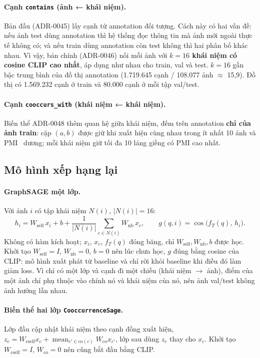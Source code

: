 \documentclass[12pt, a4paper]{article}
\newcommand{\code}[1]{\texttt{#1}}
\begin{document}
\paragraph{Cạnh \code{contains} (ảnh ← khái niệm).} Bản đầu (ADR-0045) lấy cạnh từ annotation đối tượng. Cách này có hai vấn đề: nếu ảnh test dùng annotation thì hệ thống đọc thông tin mà ảnh mới ngoài thực tế không có; và nếu train dùng annotation còn test không thì hai phân bố khác nhau. Vì vậy, bản chính (ADR-0046) nối mỗi ảnh với \textbf{$k=16$ khái niệm có cosine CLIP cao nhất}, áp dụng như nhau cho train, val và test. $k=16$ gần bậc trung bình của đồ thị annotation (1.719.645 cạnh / 108.077 ảnh $\approx$ 15,9). Đồ thị có 1.569.232 cạnh ở train và 80.000 cạnh ở mỗi tập val/test.

\paragraph{Cạnh \code{cooccurs\_with} (khái niệm ← khái niệm).} Biến thể ADR-0048 thêm quan hệ giữa khái niệm, đếm trên annotation \textbf{chỉ của ảnh train}: cặp $(a,b)$ được giữ khi xuất hiện cùng nhau trong ít nhất 10 ảnh và PMI~\cite{church1990pmi} dương; mỗi khái niệm giữ tối đa 10 láng giềng có PMI cao nhất.

\subsection{Mô hình xếp hạng lại}
\label{sec:model}
\paragraph{GraphSAGE một lớp.} Với ảnh $i$ có tập khái niệm $N(i)$, $|N(i)|=16$:
\begin{equation}
h_i = W_{\text{self}}\,x_i + b + \frac{1}{|N(i)|}\sum_{c\in N(i)} W_{\text{nb}}\,x_c,
\qquad g(q,i)=\cos\big(f_T(q),\,h_i\big).
\end{equation}
Không có hàm kích hoạt; $x_i$, $x_c$, $f_T(q)$ đóng băng, chỉ $W_{\text{self}}, W_{\text{nb}}, b$ được học. Khởi tạo $W_{\text{self}}=I$, $W_{\text{nb}}=0$, $b=0$ nên lúc chưa học, $g$ đúng bằng cosine của CLIP: mô hình xuất phát từ baseline và chỉ rời khỏi baseline khi điều đó làm giảm loss. Vì chỉ có một lớp và cạnh đi một chiều (khái niệm $\to$ ảnh), điểm của một ảnh chỉ phụ thuộc vào chính nó và khái niệm của nó, nên ảnh val/test không ảnh hưởng lẫn nhau.

\paragraph{Biến thể hai lớp \code{CooccurrenceSage}.} Lớp đầu cập nhật khái niệm theo cạnh đồng xuất hiện, $z_c = W_{\text{cself}}x_c + \operatorname{mean}_{c'\in co(c)} W_{\text{co}}x_{c'}$, lớp sau dùng $z_c$ thay cho $x_c$. Khởi tạo $W_{\text{cself}}=I$, $W_{\text{co}}=0$ nên cũng bắt đầu bằng CLIP.
\end{document}
